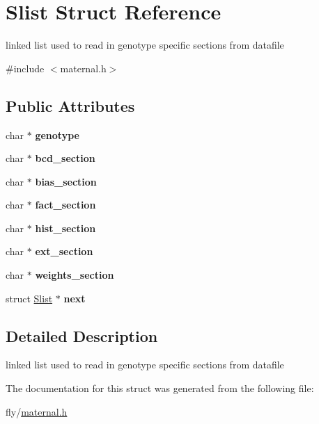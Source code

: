 \hypertarget{structSlist}{
\section{Slist Struct Reference}
\label{structSlist}
}


linked list used to read in genotype specific sections from datafile  


{\ttfamily \#include $<$maternal.h$>$}\subsection*{Public Attributes}
\begin{DoxyCompactItemize}
\item 
\hypertarget{structSlist_a8dc08b435516c025575750e163d57331}{
char $\ast$ {\bfseries genotype}}
\label{structSlist_a8dc08b435516c025575750e163d57331}

\item 
\hypertarget{structSlist_a59fcb3b01ca1824ddd7a83841c3e2519}{
char $\ast$ {\bfseries bcd\_\-section}}
\label{structSlist_a59fcb3b01ca1824ddd7a83841c3e2519}

\item 
\hypertarget{structSlist_a71473f3ecd301c77407b2faae61e3e3a}{
char $\ast$ {\bfseries bias\_\-section}}
\label{structSlist_a71473f3ecd301c77407b2faae61e3e3a}

\item 
\hypertarget{structSlist_a85f7248a4bf2af29869d7298905aa088}{
char $\ast$ {\bfseries fact\_\-section}}
\label{structSlist_a85f7248a4bf2af29869d7298905aa088}

\item 
\hypertarget{structSlist_a90139acd79b215904e8242296aa306c6}{
char $\ast$ {\bfseries hist\_\-section}}
\label{structSlist_a90139acd79b215904e8242296aa306c6}

\item 
\hypertarget{structSlist_a1ab027dca7188e0bf54c688cf9ce34ac}{
char $\ast$ {\bfseries ext\_\-section}}
\label{structSlist_a1ab027dca7188e0bf54c688cf9ce34ac}

\item 
\hypertarget{structSlist_ade57b6300ec98dfa7857889c3ba393e4}{
char $\ast$ {\bfseries weights\_\-section}}
\label{structSlist_ade57b6300ec98dfa7857889c3ba393e4}

\item 
\hypertarget{structSlist_a69e99f8defca78da65f0ce6b203b9466}{
struct \hyperlink{structSlist}{Slist} $\ast$ {\bfseries next}}
\label{structSlist_a69e99f8defca78da65f0ce6b203b9466}

\end{DoxyCompactItemize}


\subsection{Detailed Description}
linked list used to read in genotype specific sections from datafile 

The documentation for this struct was generated from the following file:\begin{DoxyCompactItemize}
\item 
fly/\hyperlink{maternal_8h}{maternal.h}\end{DoxyCompactItemize}
